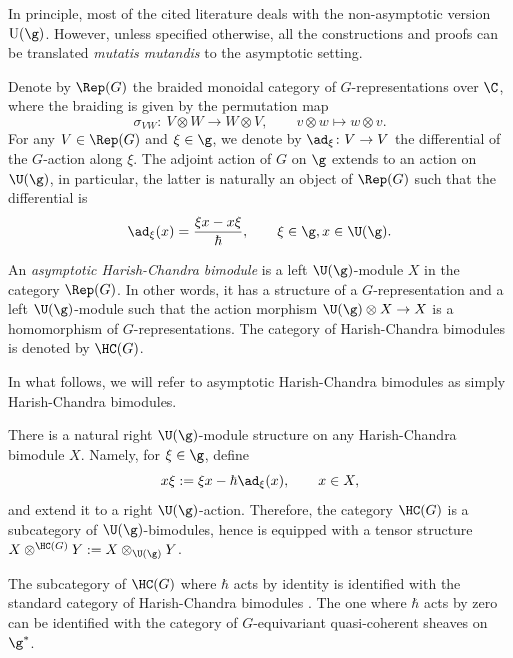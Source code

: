 	\begin{Remark}
		In principle, most of the cited literature deals with the non-asymptotic version~$\mathrm{U}(\g)$. However, unless specified otherwise, all the constructions and proofs can be translated \emph{mutatis mutandis} to the asymptotic setting.
	\end{Remark}
	
	Denote by $\Rep(G)$ the braided monoidal category of $G$-representations over $\C$, where the braiding is given by the permutation map
	\[
	\sigma_{VW} \colon\ V \otimes W \rightarrow W \otimes V, \qquad v\otimes w \mapsto w \otimes v.
	\]
	For any $V \in \Rep(G)$ and $\xi\in \g$, we denote by $\ad_{\xi} \colon V \rightarrow V$ the differential of the $G$-action along $\xi$. The adjoint action of $G$ on $\g$ extends to an action on $\U(\g)$, in particular, the latter is naturally an object of $\Rep(G)$ such that the differential is
	\begin{equation*}
		\ad_{\xi}(x) = \frac{\xi x - x \xi}{\hbar},\qquad \xi\in \g, x\in \U(\g).
	\end{equation*}
	
	\begin{Definition}
		An \emph{asymptotic Harish-Chandra bimodule} is a left $\U(\g)$-module $X$ in the category $\Rep(G)$. In other words, it has a structure of a $G$-representation and a left $\U(\g)$-module such that the action morphism
		$
		\U(\g) \otimes X \rightarrow X
		$
		is a homomorphism of $G$-representations. The category of Harish-Chandra bimodules is denoted by $\HC(G)$.
	\end{Definition}
	
	In what follows, we will refer to asymptotic Harish-Chandra bimodules as simply Harish-Chandra bimodules.
	
	There is a natural right $\U(\g)$-module structure on any Harish-Chandra bimodule $X$. Namely, for $\xi \in\g$, define
	\begin{equation}
		\label{eq::left_action}
		x\xi := \xi x - \hbar \ad_{\xi}(x),\qquad x\in X,
	\end{equation}
	and extend it to a right $\U(\g)$-action. Therefore, the category $\HC(G)$ is a subcategory of $\U(\g)$-bimodules, hence is equipped with a tensor structure
$
	X \otimes^{\HC(G)} Y := X \otimes_{\U(\g)} Y$.
	
	\begin{Remark}
		The subcategory of $\HC(G)$ where $\hbar$ acts by identity is identified with the standard category of Harish-Chandra bimodules \cite[Definition 5.2]{BernsteinGelfand}. The one where $\hbar$ acts by zero can be identified with the category of $G$-equivariant quasi-coherent sheaves on $\g^*$.
	\end{Remark}
	
